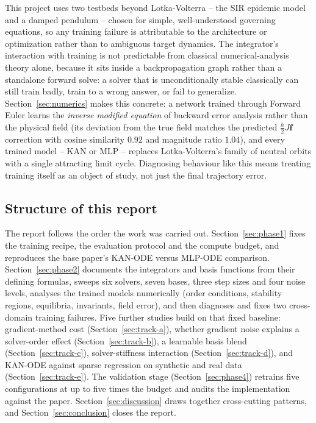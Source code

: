 This project uses two testbeds beyond Lotka-Volterra -- the SIR epidemic
model and a damped pendulum -- chosen for simple, well-understood governing
equations, so any training failure is attributable to the architecture or
optimization rather than to ambiguous target dynamics. The integrator's
interaction with training is not predictable from classical numerical-analysis
theory alone, because it sits inside a backpropagation graph rather than a
standalone forward solve: a solver that is unconditionally stable classically
can still train badly, train to a wrong answer, or fail to generalize.
Section~\ref{sec:numerics} makes this concrete: a network trained through
Forward Euler learns the \emph{inverse modified equation} of backward error
analysis rather than the physical field (its deviation from the true field
matches the predicted $\tfrac{h}{2}J\mathbf{f}$ correction with cosine
similarity $0.92$ and magnitude ratio $1.04$), and every trained
model -- KAN or MLP -- replaces Lotka-Volterra's family of neutral orbits
with a single attracting limit cycle. Diagnosing behaviour like this means
treating training itself as an object of study, not just the final
trajectory error.

\subsection{Structure of this report}

The report follows the order the work was carried out.
Section~\ref{sec:phase1} fixes the training recipe, the evaluation protocol
and the compute budget, and reproduces the base paper's KAN-ODE versus
MLP-ODE comparison. Section~\ref{sec:phase2} documents the integrators and
basis functions from their defining formulas, sweeps six solvers, seven
bases, three step sizes and four noise levels, analyses the trained models
numerically (order conditions, stability regions, equilibria, invariants,
field error), and then diagnoses and fixes two cross-domain training
failures. Five further studies build on that fixed baseline: gradient-method
cost (Section~\ref{sec:track-a}), whether gradient noise explains a
solver-order effect (Section~\ref{sec:track-b}), a learnable basis blend
(Section~\ref{sec:track-c}), solver-stiffness interaction
(Section~\ref{sec:track-d}), and KAN-ODE against sparse regression on
synthetic and real data (Section~\ref{sec:track-e}). The validation stage
(Section~\ref{sec:phase4}) retrains five configurations at up to five times
the budget and audits the implementation against the paper.
Section~\ref{sec:discussion} draws together cross-cutting patterns, and
Section~\ref{sec:conclusion} closes the report.
